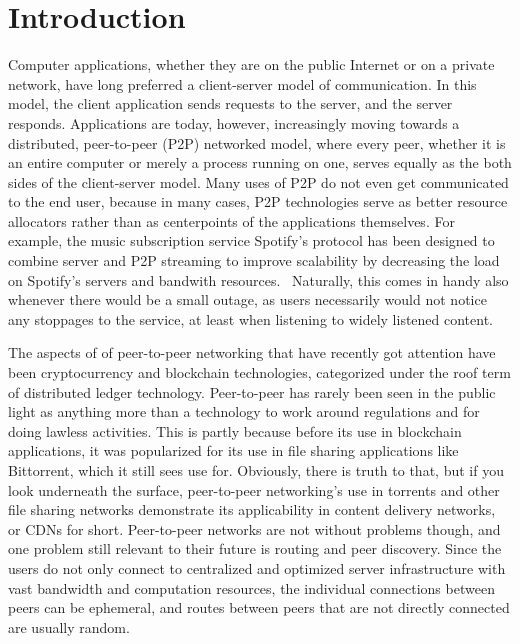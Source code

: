 \chapter{Introduction}
\label{Introduction}

Computer applications, whether they are on the public Internet or on a private network, have long preferred a client-server model of communication. In this model, the client application sends requests to the server, and the server responds. Applications are today, however, increasingly moving towards a distributed, peer-to-peer (P2P) networked model, where every peer, whether it is an entire computer or merely a process running on one, serves equally as the both sides of the client-server model. Many uses of P2P do not even get communicated to the end user, because in many cases, P2P technologies serve as better resource allocators rather than as centerpoints of the applications themselves. For example, the music subscription service Spotify's protocol has been designed to combine server and P2P streaming to improve scalability by decreasing the load on Spotify's servers and bandwith resources.~\cite{Kreitz_undated-yp} Naturally, this comes in handy also whenever there would be a small outage, as users necessarily would not notice any stoppages to the service, at least when listening to widely listened content. 

The aspects of of peer-to-peer networking that have recently got attention have been cryptocurrency and blockchain technologies, categorized under the roof term of distributed ledger technology. Peer-to-peer has rarely been seen in the public light as anything more than a technology to work around regulations and for doing lawless activities. This is partly because before its use in blockchain applications, it was popularized for its use in file sharing applications like Bittorrent, which it still sees use for. Obviously, there is truth to that, but if you look underneath the surface, peer-to-peer networking's use in torrents and other file sharing networks demonstrate its applicability in content delivery networks, or CDNs for short. Peer-to-peer networks are not without problems though, and one problem still relevant to their future is routing and peer discovery. Since the users do not only connect to centralized and optimized server infrastructure with vast bandwidth and computation resources, the individual connections between peers can be ephemeral, and routes between peers that are not directly connected are usually random.

